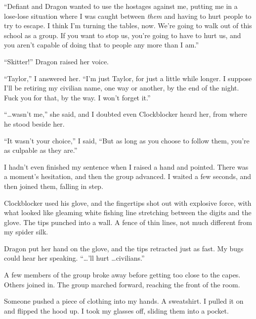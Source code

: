 ``Defiant and Dragon wanted to use the hostages against me, putting me in a lose-lose situation where I was caught between \emph{them }and having to hurt people to try to escape.  I think I'm turning the tables, now.  We're going to walk out of this school as a group.  If you want to stop us, you're going to have to hurt us, and you aren't capable of doing that to people any more than I am.''



``Skitter!'' Dragon raised her voice.



``Taylor,'' I answered her.  ``I'm just Taylor, for just a little while longer.  I suppose I'll be retiring my civilian name, one way or another, by the end of the night.  Fuck you for that, by the way.  I won't forget it.''



``\ldots wasn't me,'' she said, and I doubted even Clockblocker heard her, from where he stood beside her.



``It wasn't your choice,'' I said, ``But as long as you choose to follow them, you're as culpable as they are.''



I hadn't even finished my sentence when I raised a hand and pointed.  There was a moment's hesitation, and then the group advanced.  I waited a few seconds, and then joined them, falling in step.



Clockblocker used his glove, and the fingertips shot out with explosive force, with what looked like gleaming white fishing line stretching between the digits and the glove.  The tips punched into a wall.  A fence of thin lines, not much different from my spider silk.



Dragon put her hand on the glove, and the tips retracted just as fast.  My bugs could hear her speaking.  ``\ldots'll hurt \ldots civilians.''



A few members of the group broke away before getting too close to the capes.  Others joined in.  The group marched forward, reaching the front of the room.



Someone pushed a piece of clothing into my hands.  A sweatshirt.  I pulled it on and flipped the hood up.  I took my glasses off, sliding them into a pocket.



